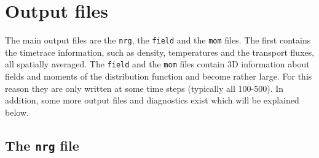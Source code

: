 \documentclass[12pt]{article}
\begin{document}
\section{Output files}
\label{sec:output}

The main output files are the \texttt{nrg}, the
\texttt{field} and the \texttt{mom} files.
The first contains the timetrace information, such as density,
temperatures and the transport fluxes, all spatially averaged.
The \texttt{field} and the \texttt{mom} files contain 3D information
 about fields and moments of the distribution function and become rather large.
For this reason they are only written at some time steps (typically all 100-500).
In addition, some more output files and diagnostics exist which will be explained below.

\subsection{The \texttt{nrg} file}
\label{subsec:nrg-file}
\end{document}
